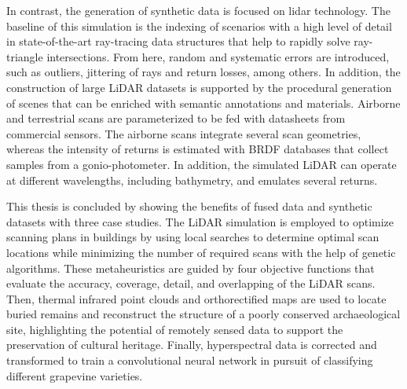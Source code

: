 In contrast, the generation of synthetic data is focused on \acrshort{lidar} technology. The baseline of this simulation is the indexing of scenarios with a high level of detail in state-of-the-art ray-tracing data structures that help to rapidly solve ray-triangle intersections. From here, random and systematic errors are introduced, such as outliers, jittering of rays and return losses, among others. In addition, the construction of large LiDAR datasets is supported by the procedural generation of scenes that can be enriched with semantic annotations and materials. Airborne and terrestrial scans are parameterized to be fed with datasheets from commercial sensors. The airborne scans integrate several scan geometries, whereas the intensity of returns is estimated with BRDF databases that collect samples from a gonio-photometer. In addition, the simulated LiDAR can operate at different wavelengths, including bathymetry, and emulates several returns.

This thesis is concluded by showing the benefits of fused data and synthetic datasets with three case studies. The LiDAR simulation is employed to optimize scanning plans in buildings by using local searches to determine optimal scan locations while minimizing the number of required scans with the help of genetic algorithms. These metaheuristics are guided by four objective functions that evaluate the accuracy, coverage, detail, and overlapping of the LiDAR scans. Then, thermal infrared point clouds and orthorectified maps are used to locate buried remains and reconstruct the structure of a poorly conserved archaeological site, highlighting the potential of remotely sensed data to support the preservation of cultural heritage. Finally, hyperspectral data is corrected and transformed to train a convolutional neural network in pursuit of classifying different grapevine varieties.